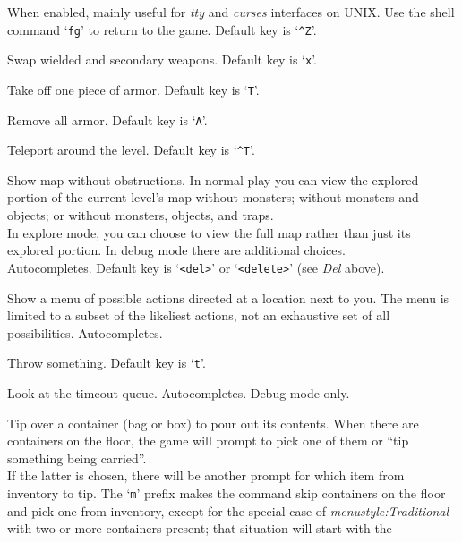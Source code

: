 When enabled, mainly useful for {\it tty\/} and {\it curses\/} interfaces on
UNIX.
Use the shell command `{\tt fg}' to return to the game.
Default key is `{\tt \^{}Z}'.
\item[\tb{\#swap}]
Swap wielded and secondary weapons. Default key is `{\tt x}'.
\item[\tb{\#takeoff}]
Take off one piece of armor. Default key is `{\tt T}'.
\item[\tb{\#takeoffall}]
Remove all armor. Default key is `{\tt A}'.
\item[\tb{\#teleport}]
Teleport around the level. Default key is `{\tt \^{}T}'.
\item[\tb{\#terrain}]
Show map without obstructions.
In normal play you can view the explored portion of the current level's
map without monsters; without monsters and objects; or without monsters,
objects, and traps.\\
In explore mode, you can choose to view the full map rather than just
its explored portion.
In debug mode there are additional choices.\\
Autocompletes.
Default key is `{\tt <del>}' or `{\tt <delete>}' (see {\it Del\/} above).
\item[\tb{\#therecmdmenu}]
Show a menu of possible actions directed at a location next to you.
The menu is limited to a subset of the likeliest actions, not an
exhaustive set of all possibilities.
Autocompletes.
\item[\tb{\#throw}]
Throw something. Default key is `{\tt t}'.
\item[\tb{\#timeout}]
Look at the timeout queue.
Autocompletes.
Debug mode only.
\item[\tb{\#tip}]
Tip over a container (bag or box) to pour out its contents.
When there are containers on the floor, the game will prompt to pick one
of them or ``tip something being carried''.
\\
If the latter is chosen, there will be another prompt for which item
from inventory to tip.
The `{\tt m}' prefix makes the command skip containers on the
floor and pick one from inventory, except for the special case of
{\it menustyle:Traditional\/}
with two or more containers present; that situation will start with the
